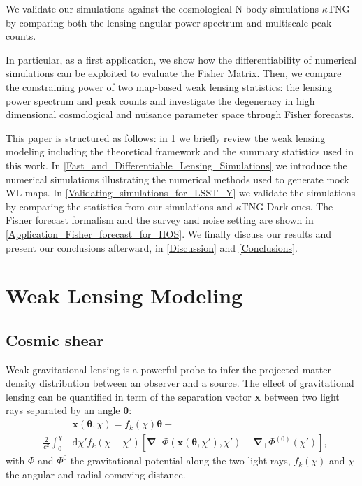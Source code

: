 \documentclass{aa}
\begin{document}
We validate our simulations against the cosmological N-body simulations $\kappa$TNG \citep{osato2021kappatng} by comparing both the lensing angular power spectrum and multiscale peak counts.

In particular, as a first application, we show how the differentiability of numerical simulations can be exploited to evaluate the Fisher Matrix. Then, we compare the constraining power of two map-based weak lensing statistics: the lensing power spectrum and peak counts and investigate the degeneracy in high dimensional cosmological and nuisance parameter space through Fisher forecasts. 

This paper is structured as follows: in \ref{weak_lesning_modeling} we briefly review the weak lensing modeling including the theoretical framework and the summary statistics used in this work. In \autoref{Fast_and_Differentiable_Lensing_Simulations} we introduce the numerical simulations illustrating the numerical methods used to generate mock WL maps. In \autoref{Validating_simulations_for_LSST_Y} we validate the simulations by comparing the statistics from our simulations and $\kappa$TNG-Dark ones.
The Fisher forecast formalism and the survey and noise setting are shown in \autoref{Application_Fisher_forecast_for_HOS}. We finally discuss our results and present our conclusions afterward, in \autoref{Discussion} and \autoref{Conclusions}.



\section{Weak Lensing Modeling}\label{weak_lesning_modeling}
\subsection{{Cosmic shear}}
Weak gravitational lensing is a powerful probe to infer the projected matter density distribution between an observer and a source.
The effect of gravitational lensing 
can be quantified in term of the separation vector \textbf{x} between two light rays separated by an angle $\boldsymbol{\theta}$:
\begin{align}\label{sep}
   & \textbf{x}(\boldsymbol{\theta},\chi) =
    f_k(\chi)\boldsymbol{\theta} + \\
   - \frac{2}{c^2}
   \int_0^{\chi}
    &  \text{d}\chi'
    f_k(\chi-\chi')
    [ \boldsymbol{\nabla_{\bot}}\Phi( \textbf{x}(\boldsymbol{\theta},\chi'),\chi')-
    \boldsymbol{\nabla_{\bot}}\Phi^{(0)}(\chi')
    ],
\end{align}
with $\Phi$ and $\Phi^{0}$ the gravitational potential along the two light rays, $f_k(\chi)$ and $\chi$ the angular and radial comoving distance.
\end{document}
